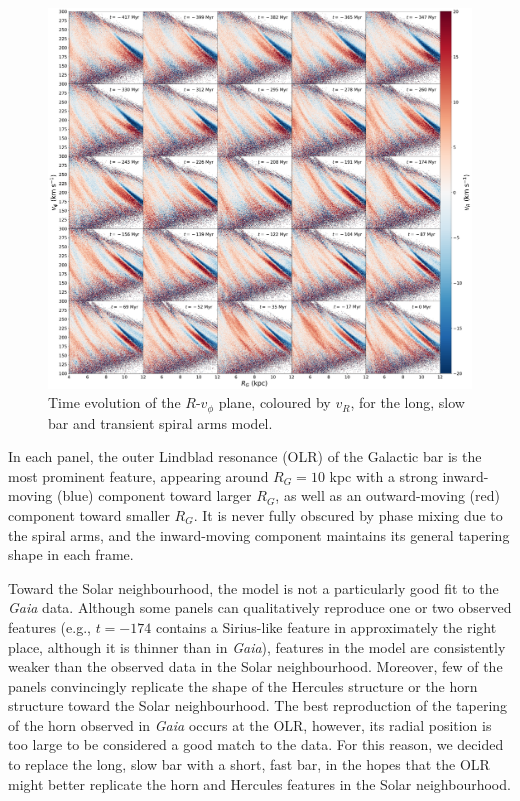 \documentclass[10pt]{article}
\begin{document}
\begin{figure}[h]
    \centering
    \includegraphics[width=\textwidth]{plots/base_spiral_RvT_vR.pdf}
    \caption{Time evolution of the $R$-$v_\phi$ plane, coloured by $v_R$, for the long, slow bar and transient spiral arms model.}
    \label{fig:lsb}
\end{figure}

In each panel, the outer Lindblad resonance (OLR) of the Galactic bar is the most prominent feature, appearing around $R_G = 10$ kpc with a strong inward-moving (blue) component toward larger $R_G$, as well as an outward-moving (red) component toward smaller $R_G$. It is never fully obscured by phase mixing due to the spiral arms, and the inward-moving component maintains its general tapering shape in each frame.

Toward the Solar neighbourhood, the model is not a particularly good fit to the \textit{Gaia} data. Although some panels can qualitatively reproduce one or two observed features (e.g., $t=-174$ contains a Sirius-like feature in approximately the right place, although it is thinner than in \textit{Gaia}), features in the model are consistently weaker than the observed data in the Solar neighbourhood. Moreover, few of the panels convincingly replicate the shape of the Hercules structure or the horn structure toward the Solar neighbourhood. The best reproduction of the tapering of the horn observed in \textit{Gaia} occurs at the OLR, however, its radial position is too large to be considered a good match to the data. For this reason, we decided to replace the long, slow bar with a short, fast bar, in the hopes that the OLR might better replicate the horn and Hercules features in the Solar neighbourhood.
\end{document}
